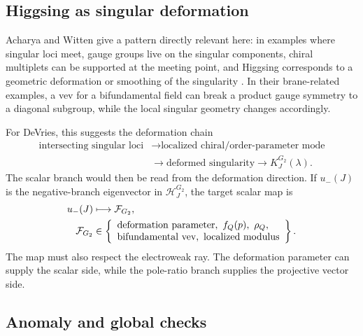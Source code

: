 \subsection{Higgsing as singular deformation}
\label{sec:g2-higgsing-deformation}

Acharya and Witten give a pattern directly relevant here: in examples where singular loci meet, gauge groups live on the singular components, chiral multiplets can be supported at the meeting point, and Higgsing corresponds to a geometric deformation or smoothing of the singularity \cite{AcharyaWitten2001}.  In their brane-related examples, a vev for a bifundamental field can break a product gauge symmetry to a diagonal subgroup, while the local singular geometry changes accordingly.

\begin{widetext}
For DeVries, this suggests the deformation chain
\begin{equation}
  \begin{aligned}
  \text{intersecting singular loci}
  &\longrightarrow
  \text{localized chiral/order-parameter mode}
  \\
  &\longrightarrow
  \text{deformed singularity}
  \longrightarrow
  K_J^{G_2}(\lambda).
  \end{aligned}
  \label{eq:g2-higgsing-chain}
\end{equation}
The scalar branch would then be read from the deformation direction.  If \(u_-(J)\) is the negative-branch eigenvector in \(\mathcal H_J^{G_2}\), the target scalar map is
\begin{equation}
  \begin{aligned}
  u_-(J)&\longmapsto \mathcal F_{G_2},
  \\
  \mathcal F_{G_2}
  &\in
  \left\{
  \begin{array}{l}
  \hbox{deformation parameter},\ f_Q(p),\ \rho_Q,\\
  \hbox{bifundamental vev},\ \hbox{localized modulus}
  \end{array}
  \right\}.
  \end{aligned}
  \label{eq:g2-negative-branch-map}
\end{equation}
The map must also respect the electroweak ray.  The deformation parameter can supply the scalar side, while the pole-ratio branch supplies the projective vector side.
\end{widetext}

\subsection{Anomaly and global checks}
\label{sec:g2-anomaly-global}

